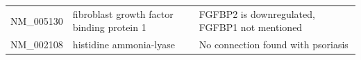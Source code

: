 \documentclass[10pt,a4paper]{report}
\begin{document}
\begin{table}[]
\begin{tabular}{l|p{4.5cm} p{8.5cm}}
			NM\_005130         & fibroblast growth factor binding protein 1                                                                              & FGFBP2 is downregulated, FGFBP1 not mentioned\cite{suarez2012expanding}                                                                                                                                                                                               \\
			NM\_002108         & histidine ammonia-lyase                                                                                                 & No connection found with psoriasis                                                                                                                                                                                                                                          \\ \hline                                                                                                                                                                                                                                        
		\end{tabular}
	\end{table}
	
\end{document}
